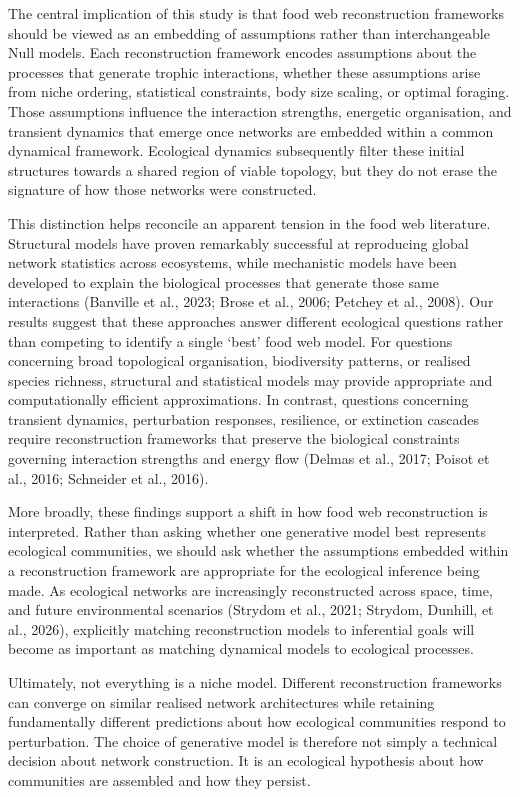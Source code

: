 \documentclass[
]{article}
\begin{document}
The central implication of this study is that food web reconstruction
frameworks should be viewed as an embedding of assumptions rather than
interchangeable Null models. Each reconstruction framework encodes
assumptions about the processes that generate trophic interactions,
whether these assumptions arise from niche ordering, statistical
constraints, body size scaling, or optimal foraging. Those assumptions
influence the interaction strengths, energetic organisation, and
transient dynamics that emerge once networks are embedded within a
common dynamical framework. Ecological dynamics subsequently filter
these initial structures towards a shared region of viable topology, but
they do not erase the signature of how those networks were constructed.

This distinction helps reconcile an apparent tension in the food web
literature. Structural models have proven remarkably successful at
reproducing global network statistics across ecosystems, while
mechanistic models have been developed to explain the biological
processes that generate those same interactions (Banville et al., 2023;
Brose et al., 2006; Petchey et al., 2008). Our results suggest that
these approaches answer different ecological questions rather than
competing to identify a single `best' food web model. For questions
concerning broad topological organisation, biodiversity patterns, or
realised species richness, structural and statistical models may provide
appropriate and computationally efficient approximations. In contrast,
questions concerning transient dynamics, perturbation responses,
resilience, or extinction cascades require reconstruction frameworks
that preserve the biological constraints governing interaction strengths
and energy flow (Delmas et al., 2017; Poisot et al., 2016; Schneider et
al., 2016).

More broadly, these findings support a shift in how food web
reconstruction is interpreted. Rather than asking whether one generative
model best represents ecological communities, we should ask whether the
assumptions embedded within a reconstruction framework are appropriate
for the ecological inference being made. As ecological networks are
increasingly reconstructed across space, time, and future environmental
scenarios (Strydom et al., 2021; Strydom, Dunhill, et al., 2026),
explicitly matching reconstruction models to inferential goals will
become as important as matching dynamical models to ecological
processes.

Ultimately, not everything is a niche model. Different reconstruction
frameworks can converge on similar realised network architectures while
retaining fundamentally different predictions about how ecological
communities respond to perturbation. The choice of generative model is
therefore not simply a technical decision about network construction. It
is an ecological hypothesis about how communities are assembled and how
they persist.
\end{document}
